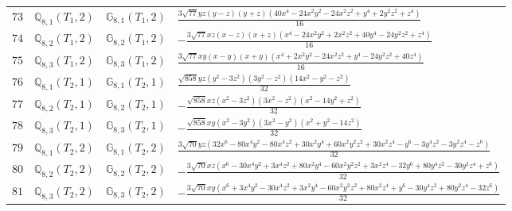\documentclass[fleqn,8pt,landscape]{jsarticle}
\begin{document}
\begin{table}[ht!]
\begin{center}
\begin{tabular}{cccl}
$ 73 $ & $ \mathbb{Q}_{8,1}(T_{1},2) $ & $ \mathbb{G}_{8,1}(T_{1},2) $ & $ \frac{3 \sqrt{77} y z \left(y - z\right) \left(y + z\right) \left(40 x^{4} - 24 x^{2} y^{2} - 24 x^{2} z^{2} + y^{4} + 2 y^{2} z^{2} + z^{4}\right)}{16} $ \\
$ 74 $ & $ \mathbb{Q}_{8,2}(T_{1},2) $ & $ \mathbb{G}_{8,2}(T_{1},2) $ & $ - \frac{3 \sqrt{77} x z \left(x - z\right) \left(x + z\right) \left(x^{4} - 24 x^{2} y^{2} + 2 x^{2} z^{2} + 40 y^{4} - 24 y^{2} z^{2} + z^{4}\right)}{16} $ \\
$ 75 $ & $ \mathbb{Q}_{8,3}(T_{1},2) $ & $ \mathbb{G}_{8,3}(T_{1},2) $ & $ \frac{3 \sqrt{77} x y \left(x - y\right) \left(x + y\right) \left(x^{4} + 2 x^{2} y^{2} - 24 x^{2} z^{2} + y^{4} - 24 y^{2} z^{2} + 40 z^{4}\right)}{16} $ \\
$ 76 $ & $ \mathbb{Q}_{8,1}(T_{2},1) $ & $ \mathbb{G}_{8,1}(T_{2},1) $ & $ \frac{\sqrt{858} y z \left(y^{2} - 3 z^{2}\right) \left(3 y^{2} - z^{2}\right) \left(14 x^{2} - y^{2} - z^{2}\right)}{32} $ \\
$ 77 $ & $ \mathbb{Q}_{8,2}(T_{2},1) $ & $ \mathbb{G}_{8,2}(T_{2},1) $ & $ - \frac{\sqrt{858} x z \left(x^{2} - 3 z^{2}\right) \left(3 x^{2} - z^{2}\right) \left(x^{2} - 14 y^{2} + z^{2}\right)}{32} $ \\
$ 78 $ & $ \mathbb{Q}_{8,3}(T_{2},1) $ & $ \mathbb{G}_{8,3}(T_{2},1) $ & $ - \frac{\sqrt{858} x y \left(x^{2} - 3 y^{2}\right) \left(3 x^{2} - y^{2}\right) \left(x^{2} + y^{2} - 14 z^{2}\right)}{32} $ \\
$ 79 $ & $ \mathbb{Q}_{8,1}(T_{2},2) $ & $ \mathbb{G}_{8,1}(T_{2},2) $ & $ \frac{3 \sqrt{70} y z \left(32 x^{6} - 80 x^{4} y^{2} - 80 x^{4} z^{2} + 30 x^{2} y^{4} + 60 x^{2} y^{2} z^{2} + 30 x^{2} z^{4} - y^{6} - 3 y^{4} z^{2} - 3 y^{2} z^{4} - z^{6}\right)}{32} $ \\
$ 80 $ & $ \mathbb{Q}_{8,2}(T_{2},2) $ & $ \mathbb{G}_{8,2}(T_{2},2) $ & $ - \frac{3 \sqrt{70} x z \left(x^{6} - 30 x^{4} y^{2} + 3 x^{4} z^{2} + 80 x^{2} y^{4} - 60 x^{2} y^{2} z^{2} + 3 x^{2} z^{4} - 32 y^{6} + 80 y^{4} z^{2} - 30 y^{2} z^{4} + z^{6}\right)}{32} $ \\
$ 81 $ & $ \mathbb{Q}_{8,3}(T_{2},2) $ & $ \mathbb{G}_{8,3}(T_{2},2) $ & $ - \frac{3 \sqrt{70} x y \left(x^{6} + 3 x^{4} y^{2} - 30 x^{4} z^{2} + 3 x^{2} y^{4} - 60 x^{2} y^{2} z^{2} + 80 x^{2} z^{4} + y^{6} - 30 y^{4} z^{2} + 80 y^{2} z^{4} - 32 z^{6}\right)}{32} $ \\
 \hline \hline
\end{tabular}
\end{center}
\end{table}
\end{document}
